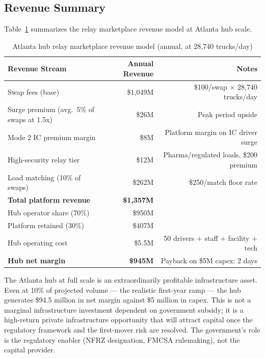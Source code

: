 \subsection{Revenue Summary}

Table~\ref{tab:revenue} summarizes the relay marketplace revenue model at Atlanta hub scale.

\begin{table}[ht]
\centering
\caption{Atlanta hub relay marketplace revenue model (annual, at 28,740 trucks/day)}
\label{tab:revenue}
\begin{tabular}{lrr}
\toprule
\textbf{Revenue Stream} & \textbf{Annual Revenue} & \textbf{Notes} \\
\midrule
Swap fees (base) & \$1,049M & \$100/swap $\times$ 28,740 trucks/day \\
Surge premium (avg.\ 5\% of swaps at 1.5x) & \$26M & Peak period upside \\
Mode 2 IC premium margin & \$8M & Platform margin on IC driver surge \\
High-security relay tier & \$12M & Pharma/regulated loads, \$200 premium \\
Load matching (10\% of swaps) & \$262M & \$250/match floor rate \\
\midrule
\textbf{Total platform revenue} & \textbf{\$1,357M} & \\
Hub operator share (70\%) & \$950M & \\
Platform retained (30\%) & \$407M & \\
\midrule
Hub operating cost & \$5.5M & 50 drivers + staff + facility + tech \\
\textbf{Hub net margin} & \textbf{\$945M} & Payback on \$5M capex: 2 days \\
\bottomrule
\end{tabular}
\end{table}

The Atlanta hub at full scale is an extraordinarily profitable infrastructure asset. Even at 10\% of projected volume --- the realistic first-year ramp --- the hub generates \$94.5 million in net margin against \$5 million in capex. This is not a marginal infrastructure investment dependent on government subsidy; it is a high-return private infrastructure opportunity that will attract capital once the regulatory framework and the first-mover risk are resolved. The government's role is the regulatory enabler (NFRZ designation, FMCSA rulemaking), not the capital provider.
